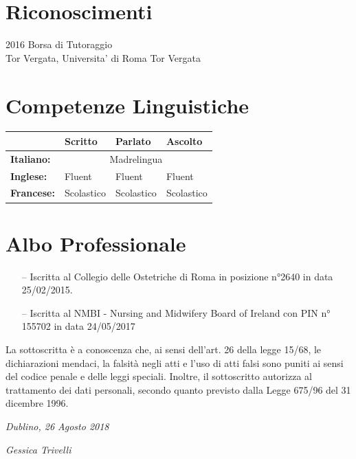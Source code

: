 \documentclass[11pt]{friggeri-cv}
\begin{document}
\vspace{-20pt}
\section{Riconoscimenti}
\begin{entrylist}
  \entry
  {2016}
  {Borsa di Tutoraggio}
  {\\Tor Vergata, Universita' di Roma Tor Vergata}
  {}
  {}
\end{entrylist}

\vspace{-20pt}
\section{Competenze Linguistiche}
\begin{table}[!h]
	\centering
  \renewcommand{\arraystretch}{1.45}
	\begin{tabular}{ p{3cm} p{3cm} p{3cm} p{3cm} }
    \hline
		& \textbf{Scritto} 	& \textbf{Parlato} & \textbf{Ascolto}			\\     \hline
		\textbf{Italiano:}	& \multicolumn{3}{c}{Madrelingua}					\\     
		\textbf{Inglese:} 	& Fluent & Fluent & Fluent \\   
		\textbf{Francese:}	& Scolastico	& Scolastico	& Scolastico \\    \hline
	\end{tabular}
\end{table}
\newpage
\section{Albo Professionale}
\begin{itemize}
  \item[--] Iscritta al Collegio delle Ostetriche di Roma in posizione 
  n°2640 in data 
  25/02/2015.
  \item[--] Iscritta al NMBI - Nursing and Midwifery Board of Ireland con PIN n° 
  155702 in data 
  24/05/2017
\end{itemize}

\vspace{75pt}
\footnotesize La sottoscritta è a conoscenza che, ai sensi dell’art. 26 della legge 
15/68, le dichiarazioni mendaci, la falsità negli atti e l’uso di
atti falsi sono puniti ai sensi del codice penale e delle leggi speciali. Inoltre, il 
sottoscritto autorizza al trattamento dei dati
personali, secondo quanto previsto dalla Legge 675/96 del 31 dicembre 1996.

\vspace{75pt}
\begin{flushleft}
\large\emph{Dublino, 26 Agosto 2018}
\end{flushleft}
\begin{flushright}
\large\emph{Gessica Trivelli}
\end{flushright}
\end{document}
